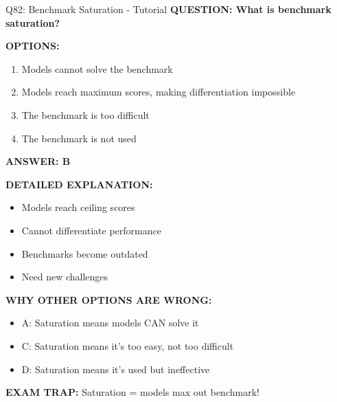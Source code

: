 \documentclass[8pt]{beamer}
\begin{document}
	\begin{frame}{Q82: Benchmark Saturation - Tutorial}
		\fontsize{6.5}{7.5}\selectfont
		\textbf{QUESTION: What is benchmark saturation?}
		
		\vspace{0.1cm}
		\textbf{OPTIONS:}
		\begin{enumerate}
			\item Models cannot solve the benchmark
			\item Models reach maximum scores, making differentiation impossible
			\item The benchmark is too difficult
			\item The benchmark is not used
		\end{enumerate}
		
		\vspace{0.1cm}
		\textcolor{myblue}{\textbf{ANSWER: B}}
		
		\vspace{0.1cm}
		\textbf{DETAILED EXPLANATION:}
		\begin{itemize}
			\item Models reach ceiling scores
			\item Cannot differentiate performance
			\item Benchmarks become outdated
			\item Need new challenges
		\end{itemize}
		
		\vspace{0.1cm}
		\textcolor{myred}{\textbf{WHY OTHER OPTIONS ARE WRONG:}}
		\begin{itemize}
			\item \textcolor{myred}{A:} Saturation means models CAN solve it
			\item \textcolor{myred}{C:} Saturation means it's too easy, not too difficult
			\item \textcolor{myred}{D:} Saturation means it's used but ineffective
		\end{itemize}
		
		\textcolor{myred}{\textbf{EXAM TRAP:}} Saturation = \textcolor{myblue}{models max out benchmark}!
	\end{frame}
	
\end{document}
